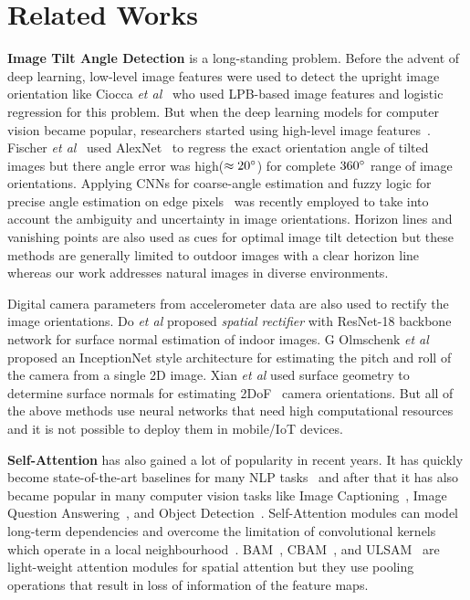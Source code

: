 \documentclass{bmvc2k}
\def\etal{\emph{et al}\bmvaOneDot}
\begin{document}
\section{Related Works}
\label{sec:related}
\textbf{Image Tilt Angle Detection} is a long-standing problem. Before the advent of deep learning, low-level image features were used to detect the upright image orientation like Ciocca \etal  ~\cite{ciocca2015lpb} who used LPB-based image features and logistic regression for this problem. But when the deep learning models for computer vision became popular, researchers started using high-level image features~\cite{vanishingnonmanhatten,wildhorizon,hold2018perceptual}. Fischer \etal~\cite{orientfisher} used AlexNet~\cite{krizhevsky2012alexnet} to regress the exact orientation angle of tilted images but there angle error was high($\approx20\degree$) for complete $360\degree$ range of image orientations. Applying CNNs for coarse-angle estimation and fuzzy logic for precise angle estimation on edge pixels~\cite{reshmalakshmi2017fuzzyedge,prince2019stepfuz} was recently employed to take into account the ambiguity and uncertainty in image orientations. Horizon lines and vanishing points are also used as cues for optimal image tilt detection but these methods are generally limited to outdoor images with a clear horizon line \cite{wildhorizon, fefilatyev2006horizon} whereas our work addresses natural images in diverse environments.

Digital camera parameters from accelerometer data are also used to rectify the image orientations. Do \etal\cite{spatialrectifier} proposed \textit{spatial rectifier} with ResNet-18 \cite{resnet} backbone network for surface normal estimation of indoor images. G Olmschenk \etal~\cite{pitchroll2d} proposed an InceptionNet \cite{inception} style architecture for estimating the pitch and roll of the camera from a single 2D image. Xian \etal\cite{uprightnet} used surface geometry to determine surface normals for estimating 2DoF~\cite{son2011twodof} camera orientations. But all of the above methods use neural networks that need high computational resources and it is not possible to deploy them in mobile/IoT devices. 

\textbf{Self-Attention} has also gained a lot of popularity in recent years. It has quickly become state-of-the-art baselines for many NLP tasks~\cite{waswani2017attention, parikh2016decomposable, cheng2016long} and after that it has also became popular in many computer vision tasks like Image Captioning~\cite{showattendtell}, Image Question Answering~\cite{imageattqa}, and Object Detection~\cite{detectiontransformer}. Self-Attention modules can model long-term dependencies and overcome the limitation of convolutional kernels which operate in a local neighbourhood~\cite{sagan}. BAM~\cite{park2018bam}, CBAM~\cite{cbam}, and ULSAM~\cite{ulsam} are light-weight attention modules for spatial attention but they use pooling operations that result in loss of information of the feature maps. 
\end{document}
